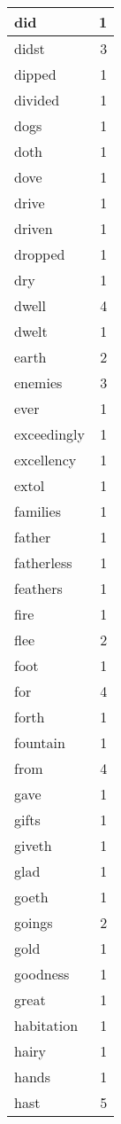 \begin{center}
\begin{longtable}{l|r}
did & 1 \\ \hline
didst & 3 \\ \hline
dipped & 1 \\ \hline
divided & 1 \\ \hline
dogs & 1 \\ \hline
doth & 1 \\ \hline
dove & 1 \\ \hline
drive & 1 \\ \hline
driven & 1 \\ \hline
dropped & 1 \\ \hline
dry & 1 \\ \hline
dwell & 4 \\ \hline
dwelt & 1 \\ \hline
earth & 2 \\ \hline
enemies & 3 \\ \hline
ever & 1 \\ \hline
exceedingly & 1 \\ \hline
excellency & 1 \\ \hline
extol & 1 \\ \hline
families & 1 \\ \hline
father & 1 \\ \hline
fatherless & 1 \\ \hline
feathers & 1 \\ \hline
fire & 1 \\ \hline
flee & 2 \\ \hline
foot & 1 \\ \hline
for & 4 \\ \hline
forth & 1 \\ \hline
fountain & 1 \\ \hline
from & 4 \\ \hline
gave & 1 \\ \hline
gifts & 1 \\ \hline
giveth & 1 \\ \hline
glad & 1 \\ \hline
goeth & 1 \\ \hline
goings & 2 \\ \hline
gold & 1 \\ \hline
goodness & 1 \\ \hline
great & 1 \\ \hline
habitation & 1 \\ \hline
hairy & 1 \\ \hline
hands & 1 \\ \hline
hast & 5 \\ \hline

\end{longtable}
\end{center}
